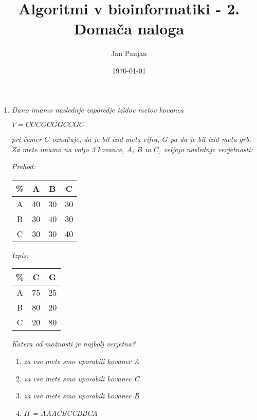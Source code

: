 \documentclass{article}
\title{Algoritmi v bioinformatiki - 2. Domača naloga}
\author{Jan Panjan}
\date{\today}
\begin{document}
\maketitle

\begin{enumerate}
	\item  \textit{Dano imamo naslednje zaporedje izidov metov kovanca}

		\begin{center}
			$V = CCCGCGGCCGC$
		\end{center}

		\textit{pri čemer $C$ označuje, da je bil izid meta cifra, $G$ pa da je bil izid meta grb.
		Za mete imamo na voljo 3 kovance, $A$, $B$ in $C$, veljajo naslednje verjetnosti:}

		\textit{Prehod:}

		\begin{center}
			\begin{tabular}{c||c|c|c}
				\% & A & B & C \\
				\hline
				\hline
				A & 40 & 30 & 30 \\
				\hline
				B & 30 & 40 & 30 \\
				\hline
				C & 30 & 30 & 40 \\
			\end{tabular}
		\end{center}

		\textit{Izpis:}

		\begin{center}
			\begin{tabular}{c||c|c}
				\% & C & G \\
				\hline
				\hline
				A & 75 & 25 \\
				\hline
				B & 80 & 20 \\
				\hline
				C & 20 & 80 \\
			\end{tabular}
		\end{center}

		\textit{Katera od možnosti je najbolj verjetna?}

		\begin{enumerate}
			\item \textit{za vse mete smo uporabili kovanec A}
			\item \textit{za vse mete smo uporabili kovanec C}
			\item \textit{za vse mete smo uporabili kovanec B}
			\item \textit{$\Pi$ = AAACBCCBBCA}
		\end{enumerate}


\end{enumerate}
\end{document}
